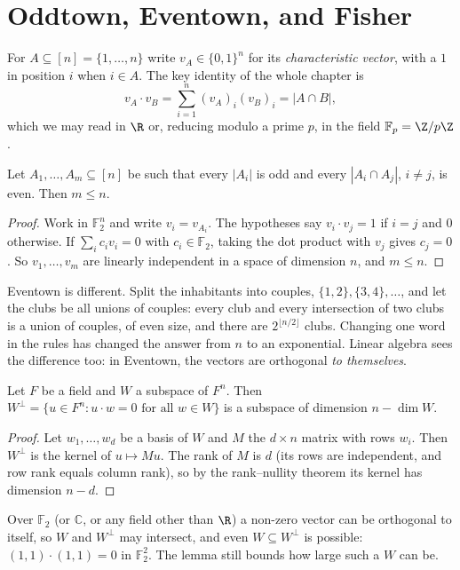 \section{Oddtown, Eventown, and Fisher}

For $A\subseteq[n]=\{1,\dots,n\}$ write $v_A\in\{0,1\}^n$ for its \emph{characteristic vector}, with a $1$ in position $i$ when $i\in A$. The key identity of the
whole chapter is
\[
v_A\cdot v_B=\sum_{i=1}^n(v_A)_i(v_B)_i=|A\cap B|,
\]
which we may read in $\R$ or, reducing modulo a prime $p$, in the field $\mathbb F_p=\Z/p\Z$.

\begin{theorem}\label{combinatorial:thm:oddtown}
Let $A_1,\dots,A_m\subseteq[n]$ be such that every $|A_i|$ is odd and every $|A_i\cap A_j|$, $i\ne j$, is even. Then $m\le n$.
\end{theorem}
\begin{proof}
Work in $\mathbb F_2^n$ and write $v_i=v_{A_i}$. The hypotheses say $v_i\cdot v_j=1$ if $i=j$ and $0$ otherwise. If $\sum_ic_iv_i=0$ with $c_i\in\mathbb F_2$, taking
the dot product with $v_j$ gives $c_j=0$. So $v_1,\dots,v_m$ are linearly independent in a space of dimension $n$, and $m\le n$.
\end{proof}

Eventown is different. Split the inhabitants into couples, $\{1,2\},\{3,4\},\dots$, and let the clubs be all unions of couples: every club and every
intersection of two clubs is a union of couples, of even size, and there are $2^{\lfloor n/2\rfloor}$ clubs. Changing one word in the rules has
changed the answer from $n$ to an exponential. Linear algebra sees the difference too: in Eventown, the vectors are orthogonal \emph{to themselves}.

\begin{lemma}\label{combinatorial:lem:perp}
Let $F$ be a field and $W$ a subspace of $F^n$. Then $W^\perp=\{u\in F^n:u\cdot w=0\text{ for all }w\in W\}$ is a subspace of dimension $n-\dim W$.
\end{lemma}
\begin{proof}
Let $w_1,\dots,w_d$ be a basis of $W$ and $M$ the $d\times n$ matrix with rows $w_i$. Then $W^\perp$ is the kernel of $u\mapsto Mu$. The rank of $M$ is $d$ (its rows are
independent, and row rank equals column rank), so by the rank--nullity theorem its kernel has dimension $n-d$.
\end{proof}

Over $\mathbb F_2$ (or $\mathbb C$, or any field other than $\R$) a non-zero vector can be orthogonal to itself, so $W$ and $W^\perp$ may intersect, and even
$W\subseteq W^\perp$ is possible: $(1,1)\cdot(1,1)=0$ in $\mathbb F_2^2$. The lemma still bounds how large such a $W$ can be.

